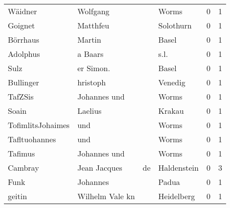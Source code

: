 \begin{center}
\begin{tiny}
\begin{longtabu}{llllrr}
                  Wäidner &                           Wolfgang &             &                                       Worms &          0 &         1 \\
                  Goignet &                           Matthfeu &             &                                   Solothurn &          0 &         1 \\
                 Börrhaus &                             Martin &             &                                       Basel &          0 &         1 \\
                 Adolphus &                            a Baars &             &                                        s.l. &          0 &         1 \\
                     Sulz &                          er Simon. &             &                                       Basel &          0 &         1 \\
                Bullinger &                           hristoph &             &                                     Venedig &          0 &         1 \\
                  TafZSis &                       Johannes und &             &                                       Worms &          0 &         1 \\
                    Soain &                            Laelius &             &                                      Krakau &          0 &         1 \\
        TofimlitsJohaimes &                                und &             &                                       Worms &          0 &         1 \\
            Tafltuohannes &                                und &             &                                       Worms &          0 &         1 \\
                  Tafimus &                       Johannes und &             &                                       Worms &          0 &         1 \\
                  Cambray &                       Jean Jacques &          de &                                 Haldenstein &          0 &         3 \\
                     Funk &                           Johannes &             &                                       Padua &          0 &         1 \\
                   geitin &                    Wilhelm Vale kn &             &                                  Heidelberg &          0 &         1 \\

\end{longtabu}
\end{tiny}
\end{center}
